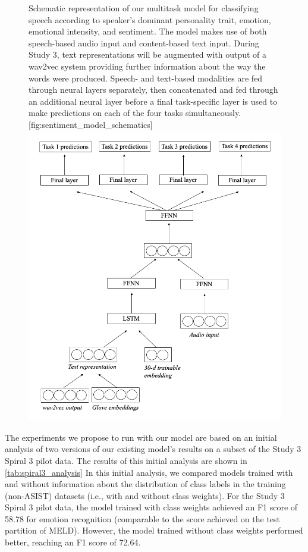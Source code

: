 \begin{figure}
    \begin{sidecaption}{%
        Schematic representation of our multitask model
    for classifying speech according to speaker's dominant personality trait,
    emotion, emotional intensity, and sentiment. The model makes use of both
    speech-based audio input and content-based text input. During Study 3,
    text representations will be augmented with output of a wav2vec system
    providing further information about the way the words were produced.
    Speech- and text-based modalities are fed through neural layers separately,
    then concatenated and fed through an additional neural layer before a final
    task-specific layer is used to make predictions on each of the four tasks
    simultaneously. }[fig:sentiment_model_schematics]
    \includegraphics[width=\textwidth]{../images/sentiment_schematics_study3.png}
    \end{sidecaption}
\end{figure}

The experiments we propose to run with our model are based on an initial
analysis of two versions of our existing model's results on a subset of the
Study 3 Spiral 3 pilot data. The results of this initial analysis are shown in
\autoref{tab:spiral3_analysis} In this initial analysis, we compared models
trained with and without information about the distribution of class labels in
the training (non-ASIST) datasets (i.e., with and without class weights).  For
the Study 3 Spiral 3 pilot data, the model trained with class weights achieved
an F1 score of 58.78 for emotion recognition (comparable to the score achieved
on the test partition of MELD). However, the model trained without class
weights performed better, reaching an F1 score of 72.64.

